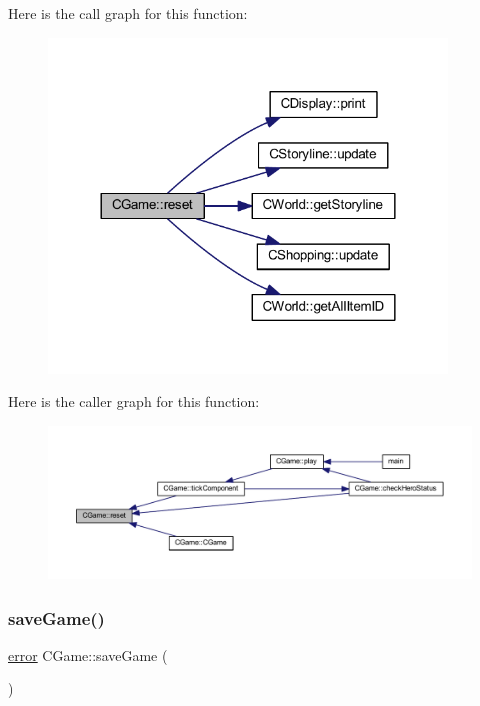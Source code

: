 Here is the call graph for this function\+:\nopagebreak
\begin{figure}[H]
\begin{center}
\leavevmode
\includegraphics[width=300pt]{class_c_game_acdb5a10d8b17584b07b3c736ede7bf57_cgraph}
\end{center}
\end{figure}
Here is the caller graph for this function\+:\nopagebreak
\begin{figure}[H]
\begin{center}
\leavevmode
\includegraphics[width=350pt]{class_c_game_acdb5a10d8b17584b07b3c736ede7bf57_icgraph}
\end{center}
\end{figure}
\mbox{\label{class_c_game_a49656fe4404b3df63f2dbebd9b754edd}} 
\subsubsection{\texorpdfstring{save\+Game()}{saveGame()}}
{\footnotesize\ttfamily \mbox{\hyperlink{_errors_list_8h_af10dacfa214e2575bb2e0ee407c242e0}{error}} C\+Game\+::save\+Game (\begin{DoxyParamCaption}{ }\end{DoxyParamCaption})\hspace{0.3cm}{\ttfamily [protected]}}

